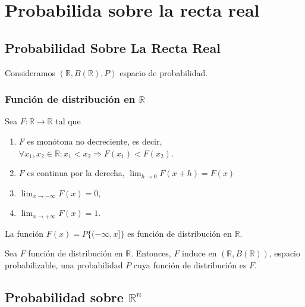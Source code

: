 \chapter{Probabilida sobre la recta real}

\section{Probabilidad Sobre La Recta Real}

\begin{nota}
  Consideramos $(\mathbb{R}, B(\mathbb{R}), P)$ espacio de probabilidad.
\end{nota}

\subsection{Función de distribución en $\mathbb{R}$}

\begin{defn}
  Sea $F: \mathbb{R} \to \mathbb{R}$ tal que
  \begin{enumerate}[label=(\roman*)]
    \item $F$ es monótona no decreciente, es decir, $ \forall x_{1}, x_{2} \in \mathbb{R}: x_{1} < x_{2} \Rightarrow F(x_{1}) < F(x_{2})$.
    \item $F$ es continua por la derecha, $\lim_{h \to 0} F(x + h) = F(x)$
    \item $\lim_{x \to -\infty} F(x) = 0$,
    \item $\lim_{x \to +\infty} F(x) = 1$.
  \end{enumerate}
\end{defn}

\begin{theo}
  La función $F(x) = P \{ (- \infty, x] \}$ es función de distribución en $\mathbb{R}$.
\end{theo}

\begin{theo}
  Sea $F$ función de distribución en $\mathbb{R}$. Entonces, $F$ induce en $(\mathbb{R}, B(\mathbb{R}))$, espacio probabilizable, una probabilidad $P$ cuya función de distribución es $F$.
\end{theo}

\section{Probabilidad sobre $\mathbb{R}^n$}

